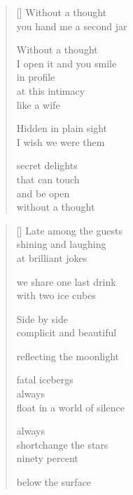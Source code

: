 \documentclass[12pt,a4paper]{article}
\begin{document}
\begin{verse}[\versewidth]
  Without a thought \\
  you hand me a second jar

  Without a thought \\
  I open it and you smile \\
  in profile \\
  at this intimacy \\
  like a wife

  Hidden in plain sight \\
  I wish we were them

  secret delights \\
  that can touch \\
  and be open \\
  without a thought
\end{verse}


\newpage

\poemtitle{}

\settowidth{\versewidth}{float on a world of silence}

\bigskip

\begin{verse}[\versewidth]
  Late among the guests \\
  shining and laughing \\
  at brilliant jokes

  we share one last drink \\
  with two ice cubes

  Side by side \\
  complicit and beautiful

  reflecting the moonlight

  fatal icebergs \\
  always \\
  float in a world of silence

  always \\
  shortchange the stars \\
  ninety percent

  below the surface
\end{verse}


\newpage

\poemtitle{}

\settowidth{\versewidth}{gently beat to the rhythm}
\end{document}
